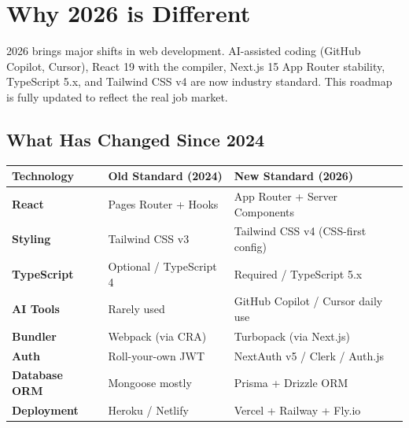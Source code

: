 \documentclass[12pt,a4paper]{article}
\begin{document}
\tableofcontents
\newpage

\section{Why 2026 is Different}

\begin{newbox}
2026 brings major shifts in web development. AI-assisted coding (GitHub Copilot, Cursor), React 19 with the compiler, Next.js 15 App Router stability, TypeScript 5.x, and Tailwind CSS v4 are now industry standard. This roadmap is fully updated to reflect the real job market.
\end{newbox}

\vspace{0.4cm}
\subsection{What Has Changed Since 2024}

\begin{center}
\begin{tabularx}{\textwidth}{|>{\bfseries}l|X|X|}
\hline
\rowcolor{FaranDark}
\color{white}\textbf{Technology} & \color{white}\textbf{Old Standard (2024)} & \color{white}\textbf{New Standard (2026)} \\
\hline
React & Pages Router + Hooks & App Router + Server Components \\
\hline
\rowcolor{FaranLight}
Styling & Tailwind CSS v3 & Tailwind CSS v4 (CSS-first config) \\
\hline
TypeScript & Optional / TypeScript 4 & Required / TypeScript 5.x \\
\hline
\rowcolor{FaranLight}
AI Tools & Rarely used & GitHub Copilot / Cursor daily use \\
\hline
Bundler & Webpack (via CRA) & Turbopack (via Next.js) \\
\hline
\rowcolor{FaranLight}
Auth & Roll-your-own JWT & NextAuth v5 / Clerk / Auth.js \\
\hline
Database ORM & Mongoose mostly & Prisma + Drizzle ORM \\
\hline
\rowcolor{FaranLight}
Deployment & Heroku / Netlify & Vercel + Railway + Fly.io \\
\hline
\end{tabularx}
\end{center}

\newpage

\end{document}
